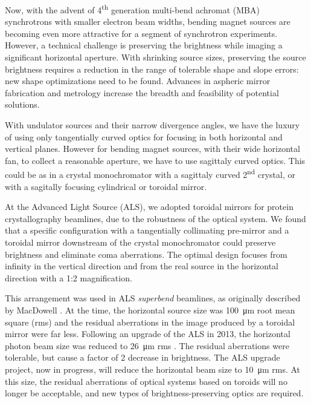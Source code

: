 \documentclass{iucr}       %
\newcommand{\inred}[1]{{\color{red}#1}}
\begin{document}
Now, with the advent of 4\textsuperscript{th} generation multi-bend achromat (MBA) synchrotrons with smaller electron beam widths, bending magnet sources are becoming even more attractive for a segment of synchrotron experiments. However, a technical challenge is preserving the brightness while imaging a significant horizontal aperture. With shrinking source sizes, preserving the source brightness requires a reduction in the range of tolerable shape and slope errors: new shape optimizations need to be found. Advances in aspheric mirror fabrication and metrology increase the breadth and feasibility of potential solutions.

With undulator sources and their narrow divergence angles, we have the luxury of using only tangentially curved optics for focusing in both horizontal and vertical planes. However for bending magnet sources, with their wide horizontal fan, to collect a reasonable aperture, we have to use sagittaly curved optics. This could be as in a crystal monochromator with a sagittaly curved 2\textsuperscript{nd} crystal, or with a sagitally focusing cylindrical or toroidal mirror.

At the Advanced Light Source (ALS), we adopted toroidal mirrors for protein crystallography beamlines, due to the robustness of the optical system. We found that a specific configuration with a tangentially collimating pre-mirror and a toroidal mirror downstream of the crystal monochromator could preserve brightness and eliminate coma aberrations. The optimal design focuses from infinity in the vertical direction and from the real source in the horizontal direction with a 1:2 magnification.

This arrangement was used in ALS \emph{superbend} beamlines, as originally described by MacDowell \cite{MacDowell2004}. At the time, the horizontal source size was \SI{100}{\micro\meter} root mean square (rms) and the residual aberrations in the image produced by a toroidal mirror were far less. Following an upgrade of the ALS in 2013, the horizontal photon beam size was reduced \cite{Steier_2014} to
\SI{26}{\micro\meter} rms . The residual aberrations were tolerable, but cause a factor of 2 decrease in brightness. The ALS upgrade project, now in progress, will reduce the horizontal beam size to
\SI{10}{\micro\meter} rms. At this size, the residual aberrations of optical systems based on toroids will no longer be acceptable, and new types of brightness-preserving optics are required.
\end{document}
